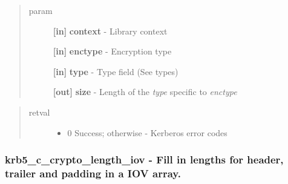 \documentclass[letterpaper,10pt,english]{sphinxmanual}
\begin{document}
\begin{quote}\begin{description}
\item[{param}] \leavevmode
\textbf{{[}in{]}} \textbf{context} - Library context

\textbf{{[}in{]}} \textbf{enctype} - Encryption type

\textbf{{[}in{]}} \textbf{type} - Type field (See  types)

\textbf{{[}out{]}} \textbf{size} - Length of the \emph{type} specific to \emph{enctype}

\end{description}\end{quote}
\begin{quote}\begin{description}
\item[{retval}] \leavevmode\begin{itemize}
\item {} 
0   Success; otherwise - Kerberos error codes

\end{itemize}

\end{description}\end{quote}


\subsubsection{krb5\_c\_crypto\_length\_iov -  Fill in lengths for header, trailer and padding in a IOV array.}
\label{appdev/refs/api/krb5_c_crypto_length_iov:krb5-c-crypto-length-iov-fill-in-lengths-for-header-trailer-and-padding-in-a-iov-array}\label{appdev/refs/api/krb5_c_crypto_length_iov::doc}

\begin{fulllineitems}
\label{appdev/refs/api/krb5_c_crypto_length_iov:krb5_c_crypto_length_iov}
\end{fulllineitems}
\end{document}
